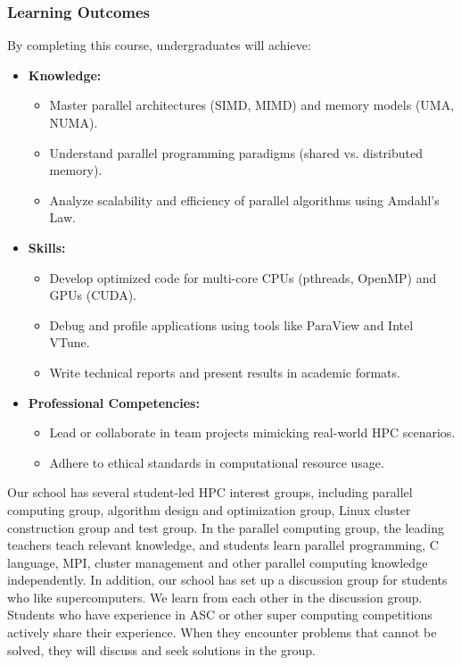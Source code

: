 \documentclass[a4paper,12pt]{article}
\begin{document}
\subsubsection*{Learning Outcomes}
By completing this course, undergraduates will achieve:
\begin{itemize}
    \item \textbf{Knowledge:}
        \begin{itemize}
            \item Master parallel architectures (SIMD, MIMD) and memory models (UMA, NUMA).
            \item Understand parallel programming paradigms (shared vs. distributed memory).
            \item Analyze scalability and efficiency of parallel algorithms using Amdahl's Law.
        \end{itemize}
    \item \textbf{Skills:}
        \begin{itemize}
            \item Develop optimized code for multi-core CPUs (pthreads, OpenMP) and GPUs (CUDA).
            \item Debug and profile applications using tools like ParaView and Intel VTune.
            \item Write technical reports and present results in academic formats.
        \end{itemize}
    \item \textbf{Professional Competencies:}
        \begin{itemize}
            \item Lead or collaborate in team projects mimicking real-world HPC scenarios.
            \item Adhere to ethical standards in computational resource usage.
        \end{itemize}
\end{itemize}

Our school has several student-led HPC interest groups, including parallel computing group, algorithm design and optimization group, Linux cluster construction group and test group. In the parallel computing group, the leading teachers teach relevant knowledge, and students learn parallel programming, C language, MPI, cluster management and other parallel computing knowledge independently. In addition, our school has set up a discussion group for students who like supercomputers. We learn from each other in the discussion group. Students who have experience in ASC or other super computing competitions actively share their experience. When they encounter problems that cannot be solved, they will discuss and seek solutions in the group.
\end{document}
